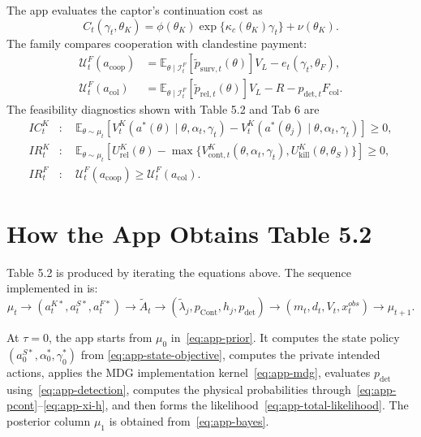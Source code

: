 \documentclass[ecta,nameyear,final,supplement]{econsocart}
\numberwithin{equation}{section}
\newcommand{\E}{\mathbb{E}}
\newcommand{\thetak}{\theta_K}
\newcommand{\lambdat}{\widetilde{\lambda}}
\begin{document}
The app evaluates the captor's continuation cost as
\begin{equation}
C_t(\gamma_t,\thetak)
=
\phi(\thetak)\exp\{\kappa_c(\thetak)\gamma_t\}+\nu(\thetak).
\label{eq:app-k-cost}
\end{equation}
The family compares cooperation with clandestine payment:
\begin{align}
\mathcal U_t^F(a_{\mathrm{coop}})
&=
\E_{\theta\mid\mathcal I_t^F}
\left[\widetilde p_{\mathrm{surv},t}(\theta)\right]V_L
-e_t(\gamma_t,\theta_F),
\label{eq:app-f-coop}\\
\mathcal U_t^F(a_{\mathrm{col}})
&=
\E_{\theta\mid\mathcal I_t^F}
\left[\widetilde p_{\mathrm{rel},t}(\theta)\right]V_L
-R-p_{\mathrm{det},t}F_{\mathrm{col}}.
\label{eq:app-f-col}
\end{align}
The feasibility diagnostics shown with Table 5.2 and Tab 6 are
\begin{align}
IC_t^K&:
\quad
\E_{\theta\sim\mu_t}
\left[
V_t^K(a^\ast(\theta)\mid\theta,\alpha_t,\gamma_t)
-V_t^K(a^\ast(\theta_j)\mid\theta,\alpha_t,\gamma_t)
\right]\ge0,
\label{eq:app-ic-k}\\
IR_t^K&:
\quad
\E_{\theta\sim\mu_t}
\left[
U^K_{\mathrm{rel}}(\theta)
-\max\{V^K_{\mathrm{cont},t}(\theta,\alpha_t,\gamma_t),
U^K_{\mathrm{kill}}(\theta,\theta_S)\}
\right]\ge0,
\label{eq:app-ir-k}\\
IR_t^F&:
\quad
\mathcal U_t^F(a_{\mathrm{coop}})
\ge
\mathcal U_t^F(a_{\mathrm{col}}).
\label{eq:app-ir-f}
\end{align}

\section{How the App Obtains Table 5.2}

Table 5.2 is produced by iterating the equations above. The sequence implemented
in  is:
\begin{equation}
\mu_t
\rightarrow
(a_t^{K\ast},a_t^{S\ast},a_t^{F\ast})
\rightarrow
\widetilde A_t
\rightarrow
(\lambdat_j,p_{\mathrm{Cont}},h_j,p_{\mathrm{det}})
\rightarrow
(m_t,d_t,V_t,x_t^{obs})
\rightarrow
\mu_{t+1}.
\label{eq:app-cycle}
\end{equation}

At $\tau=0$, the app starts from $\mu_0$ in~\eqref{eq:app-prior}. It computes
the state policy $(a_0^{S\ast},\alpha_0^\ast,\gamma_0^\ast)$ from
\eqref{eq:app-state-objective}, computes the private intended actions, applies
the MDG implementation kernel~\eqref{eq:app-mdg}, evaluates
$p_{\mathrm{det}}$ using~\eqref{eq:app-detection}, computes the physical
probabilities through~\eqref{eq:app-pcont}--\eqref{eq:app-xi-h}, and then forms
the likelihood~\eqref{eq:app-total-likelihood}. The posterior column
$\mu_1$ is obtained from~\eqref{eq:app-bayes}.
\end{document}
